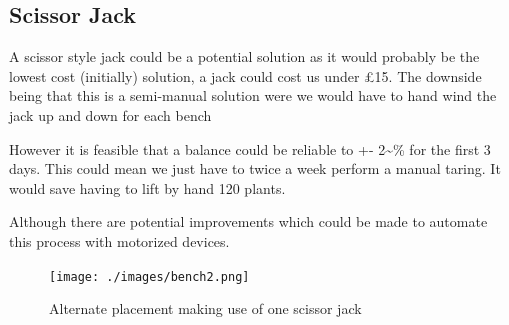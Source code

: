 \documentclass[11pt]{article}
\begin{document}
\subsection{Scissor Jack}
\label{sec-1-2}

A scissor style jack could be a potential solution as it would probably be the lowest cost (initially) solution, a 
jack could cost us under £15. The downside being that this is a semi-manual solution were we would have to hand wind
the jack up and down for each bench

However it is feasible that a balance could be reliable to +- 2\textasciitilde{}\% for the first 3 days. This could mean we just have to twice a week perform a manual taring. It would save having to 
lift by hand 120 plants. 

Although there are potential improvements which could be made to automate this process with motorized devices. 

\begin{figure}[htb]
\centering
\texttt{[image: ./images/bench2.png]}
\caption{\label{fig:Scissor-Jack-2}Alternate placement making use of one scissor jack}
\end{figure}
\end{document}

